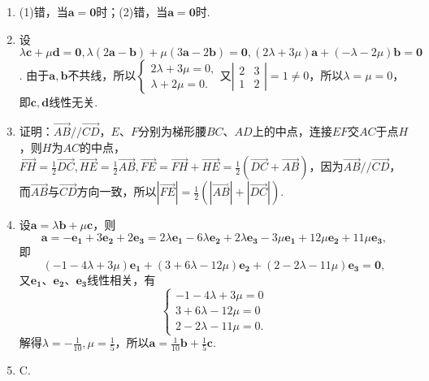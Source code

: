 \documentclass[UTF8]{ctexart}
\begin{document}
\begin{enumerate}
\item (1)错，当$\mathbf{a}=\mathbf{0}$时；(2)错，当$\mathbf{a}=\mathbf{0}$时.
\item 设$\lambda\mathbf{c}+\mu\mathbf{d}=\mathbf{0},\lambda(2\mathbf{a}-\mathbf{b})+\mu(3\mathbf{a}-2\mathbf{b})=\mathbf{0},(2\lambda+3\mu)\mathbf{a}+(-\lambda-2\mu)\mathbf{b}=\mathbf{0}$. 由于$\mathbf{a},\mathbf{b}$不共线，所以$\left\{\begin{array}{ll}2\lambda+3\mu=0,\\ \lambda+2\mu=0.\end{array}\right.$又$\left|\begin{array}{cc}2&3\\1&2\end{array}\right|=1\neq0$，所以$\lambda=\mu=0$，即$\mathbf{c},\mathbf{d}$线性无关. 
\item 证明：$\overrightarrow{AB}//\overrightarrow{CD}$，$E$、$F$分别为梯形腰$BC$、$AD$上的中点，连接$EF$交$AC$于点$H$，则$H$为$AC$的中点，$\overrightarrow{FH}=\displaystyle\frac{1}{2}\overrightarrow{DC},\overrightarrow{HE}=\displaystyle\frac{1}{2}\overrightarrow{AB},\overrightarrow{FE}=\overrightarrow{FH}+\overrightarrow{HE}=\displaystyle\frac{1}{2}\left(\overrightarrow{DC}+\overrightarrow{AB}\right)$，因为$\overrightarrow{AB}//\overrightarrow{CD}$，而$\overrightarrow{AB}$与$\overrightarrow{CD}$方向一致，所以$\left|\overrightarrow{FE}\right|=\displaystyle\frac{1}{2}\left(\left|\overrightarrow{AB}\right|+\left|\overrightarrow{DC}\right|\right)$.

\item 设$\mathbf{a}=\lambda\mathbf{b}+\mu\mathbf{c}$，则$$\mathbf{a}=-\mathbf{e_1}+3\mathbf{e_2}+2\mathbf{e_3}=2\lambda\mathbf{e_1}-6\lambda\mathbf{e_2}+2\lambda\mathbf{e_3}-3\mu\mathbf{e_1}+12\mu\mathbf{e_2}+11\mu\mathbf{e_3},$$即$$\left(-1-4\lambda+3\mu\right)\mathbf{e_1}+\left(3+6\lambda-12\mu\right)\mathbf{e_2}+\left(2-2\lambda-11\mu\right)\mathbf{e_3}=\mathbf{0},$$又$\mathbf{e_1}$、$\mathbf{e_2}$、$\mathbf{e_3}$线性相关，有$$\left\{\begin{array}{lll}-1-4\lambda+3\mu=0\\ 3+6\lambda-12\mu=0\\ 2-2\lambda-11\mu=0. \end{array}\right.$$解得$\lambda=-\displaystyle\frac{1}{10},\mu=\displaystyle\frac{1}{5}$，所以$\mathbf{a}=\displaystyle\frac{1}{10}\mathbf{b}+\displaystyle\frac{1}{5}\mathbf{c}$.

\item C.


\end{enumerate}
\end{document}
